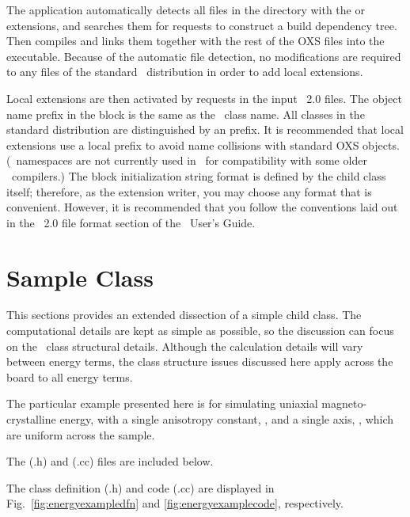 The  application automatically detects all files in the
 directory with the  or 
extensions, and searches them for  requests to construct
a build dependency tree.  Then  compiles and links them
together with the rest of the OXS files into the  executable.
Because of the automatic file detection, no modifications are required
to any files of the standard \OOMMF\ distribution in order to add local
extensions.

Local extensions are then activated by  requests in the
input \MIF~2.0 files.  The object name prefix in the  block
is the same as the \Cplusplus\ class name.  All  classes in
the standard distribution are distinguished by an  prefix.  It
is recommended that local extensions use a local prefix to avoid name
collisions with standard OXS objects.  (\Cplusplus\ namespaces are not
currently used in \OOMMF\ for compatibility with some older \Cplusplus\
compilers.)  The  block initialization string format is
defined by the \cd{Oxs\_Ext} child class itself; therefore, as the
extension writer, you may choose any format that is convenient.
However, it is recommended that you follow the conventions laid out in
the \MIF~2.0 file format section of the \OOMMF\ User's Guide.


\section{Sample  Class}\label{sec:energyexample}
This sections provides an extended dissection of a simple
\cd{Oxs\_Energy} child class.  The computational details are kept as
simple as possible, so the discussion can focus on the \Cplusplus\ class
structural details.  Although the calculation details will vary between
energy terms, the class structure issues discussed here apply across the
board to all energy terms.

The particular example presented here is for simulating
uniaxial magneto-crystalline energy, with a single anisotropy constant,
\cd{K1}, and a single axis, \cd{axis}, which are uniform across the
sample.
\begin{htmlonly}
The  (.h) and
\htmlonlyref{code}{fig:energyexamplecode} (.cc) files are included below.
\end{htmlonly}
\begin{latexonly}
The class definition (.h) and code (.cc) are displayed in
Fig.~\ref{fig:energyexampledfn} and \ref{fig:energyexamplecode},
respectively.
\end{latexonly}

